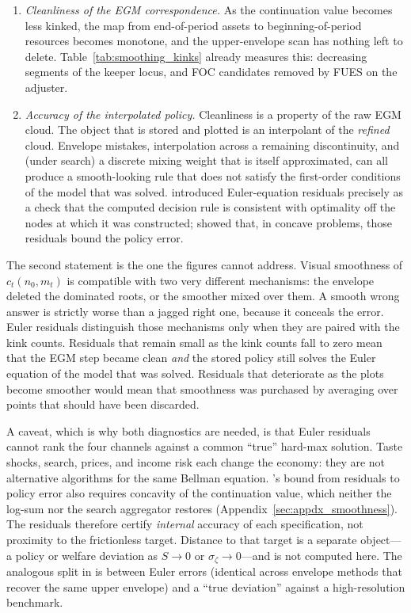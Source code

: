 \begin{enumerate}
	\item \emph{Cleanliness of the EGM correspondence.} As the continuation value becomes less kinked, the map from end-of-period assets to beginning-of-period resources becomes monotone, and the upper-envelope scan has nothing left to delete. Table~\ref{tab:smoothing_kinks} already measures this: decreasing segments of the keeper locus, and FOC candidates removed by FUES on the adjuster.
	\item \emph{Accuracy of the interpolated policy.} Cleanliness is a property of the raw EGM cloud. The object that is stored and plotted is an interpolant of the \emph{refined} cloud. Envelope mistakes, interpolation across a remaining discontinuity, and (under search) a discrete mixing weight that is itself approximated, can all produce a smooth-looking rule that does not satisfy the first-order conditions of the model that was solved. \citet{Judd1992-sp} introduced Euler-equation residuals precisely as a check that the computed decision rule is consistent with optimality off the nodes at which it was constructed; \citet{Santos2000-ec} showed that, in concave problems, those residuals bound the policy error.
\end{enumerate}

The second statement is the one the figures cannot address. Visual smoothness of $c_t(n_0,m_t)$ is compatible with two very different mechanisms: the envelope deleted the dominated roots, or the smoother mixed over them. A smooth wrong answer is strictly worse than a jagged right one, because it conceals the error. Euler residuals distinguish those mechanisms only when they are paired with the kink counts. Residuals that remain small as the kink counts fall to zero mean that the EGM step became clean \emph{and} the stored policy still solves the Euler equation of the model that was solved. Residuals that deteriorate as the plots become smoother would mean that smoothness was purchased by averaging over points that should have been discarded.

A caveat, which is why both diagnostics are needed, is that Euler residuals cannot rank the four channels against a common ``true'' hard-max solution. Taste shocks, search, prices, and income risk each change the economy: they are not alternative algorithms for the same Bellman equation. \citet{Santos2000-ec}'s bound from residuals to policy error also requires concavity of the continuation value, which neither the log-sum nor the search aggregator restores (Appendix~\ref{sec:appdx_smoothness}). The residuals therefore certify \emph{internal} accuracy of each specification, not proximity to the frictionless target. Distance to that target is a separate object---a policy or welfare deviation as $S\to 0$ or $\sigma_\zeta\to 0$---and is not computed here. The analogous split in \citet{Dobrescu2022-ii} is between Euler errors (identical across envelope methods that recover the same upper envelope) and a ``true deviation'' against a high-resolution benchmark.

